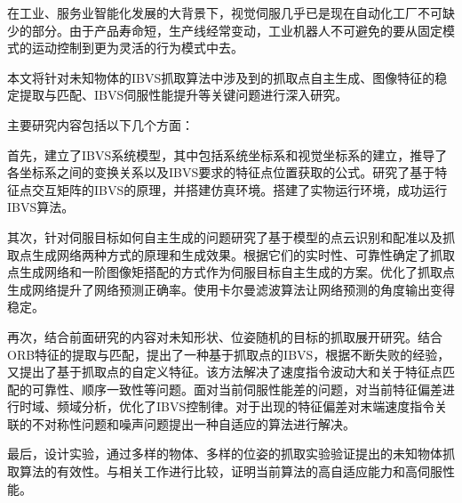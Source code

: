 \begin{cabstract}
在工业、服务业智能化发展的大背景下，视觉伺服几乎已是现在自动化工厂不可缺少的部分。由于产品寿命短，生产线经常变动，工业机器人不可避免的要从固定模式的运动控制到更为灵活的行为模式中去。


本文将针对未知物体的IBVS抓取算法中涉及到的抓取点自主生成、图像特征的稳定提取与匹配、IBVS伺服性能提升等关键问题进行深入研究。


主要研究内容包括以下几个方面：


首先，建立了IBVS系统模型，其中包括系统坐标系和视觉坐标系的建立，推导了各坐标系之间的变换关系以及IBVS要求的特征点位置获取的公式。研究了基于特征点交互矩阵的IBVS的原理，并搭建仿真环境。搭建了实物运行环境，成功运行IBVS算法。


其次，针对伺服目标如何自主生成的问题研究了基于模型的点云识别和配准以及抓取点生成网络两种方式的原理和生成效果。根据它们的实时性、可靠性确定了抓取点生成网络和一阶图像矩搭配的方式作为伺服目标自主生成的方案。优化了抓取点生成网络提升了网络预测正确率。使用卡尔曼滤波算法让网络预测的角度输出变得稳定。


再次，结合前面研究的内容对未知形状、位姿随机的目标的抓取展开研究。结合ORB特征的提取与匹配，提出了一种基于抓取点的IBVS，根据不断失败的经验，又提出了基于抓取点的自定义特征。该方法解决了速度指令波动大和关于特征点匹配的可靠性、顺序一致性等问题。面对当前伺服性能差的问题，对当前特征偏差进行时域、频域分析，优化了IBVS控制律。对于出现的特征偏差对末端速度指令关联的不对称性问题和噪声问题提出一种自适应的算法进行解决。


最后，设计实验，通过多样的物体、多样的位姿的抓取实验验证提出的未知物体抓取算法的有效性。与相关工作进行比较，证明当前算法的高自适应能力和高伺服性能。


\end{cabstract}

